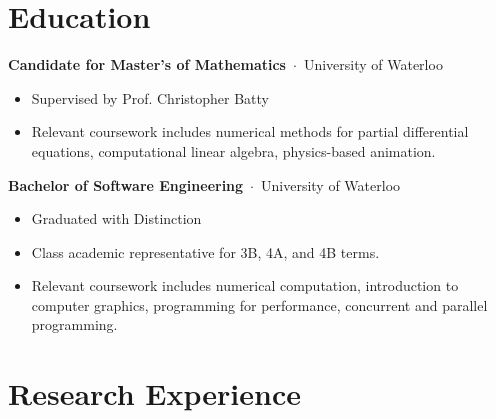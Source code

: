 \documentclass[oneside, 11pt]{memoir}
\newcommand{\entryGeneral}[5]{
  \begin{adjustwidth}{0.4em}{0em}%
  \textbf{#1}~$\cdot$~#2\sourceatright{\Date \small #3~--~#4}%
  \begin{adjustwidth}{0.5em}{2.75em}
    \begin{flushleft}
      {
        \Merriweather \small
        #5
      }%
    \end{flushleft}
  \end{adjustwidth}
  \end{adjustwidth}
}
\newcommand{\entryEducation}[4]{
  \begin{adjustwidth}{0.4em}{0em}%
  \textbf{#1}~$\cdot$~#2\sourceatright{\Date \small #3}%
  \begin{adjustwidth}{0.5em}{2.75em}
    \begin{flushleft}
      {
        \Merriweather \small
        #4
      }%
    \end{flushleft}
  \end{adjustwidth}
  \end{adjustwidth}
}
\begin{document}
\section*{Education}
\entryEducation{Candidate for Master's of Mathematics}{University of Waterloo}{2024}{
    \begin{itemize}
        \item {
            Supervised by Prof. Christopher Batty
        }
        \item {
            Relevant coursework includes numerical methods for partial differential equations, computational linear algebra, physics-based animation.  
        }
    \end{itemize}
}


\entryEducation{Bachelor of Software Engineering}{University of Waterloo}{2022}{
    \begin{itemize}
        \item {
            Graduated with Distinction
        }
        \item {
            Class academic representative for 3B, 4A, and 4B terms.
        }
        \item {
          Relevant coursework includes numerical computation, introduction to computer graphics, programming for performance, concurrent and parallel programming.
        }
    \end{itemize}
}


%
\section*{Research Experience}


\end{document}
